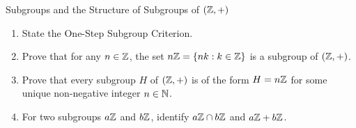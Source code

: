 \begin{exercise}{Subgroups and the Structure of Subgroups of $(\mathbb{Z}, +)$}
\begin{enumerate}[leftmargin=1.5em,itemsep=2pt]
  \item State the One-Step Subgroup Criterion.
  \item Prove that for any $n \in \mathbb{Z}$, the set $n\mathbb{Z} = \{nk : k \in \mathbb{Z}\}$ is a subgroup of $(\mathbb{Z}, +)$.
  \item Prove that every subgroup $H$ of $(\mathbb{Z}, +)$ is of the form $H = n\mathbb{Z}$ for some unique non-negative integer $n \in \mathbb{N}$.
  \item For two subgroups $a\mathbb{Z}$ and $b\mathbb{Z}$, identify $a\mathbb{Z} \cap b\mathbb{Z}$ and $a\mathbb{Z} + b\mathbb{Z}$.
\end{enumerate}
\end{exercise}

\begin{tabletworkspace}[5.5cm]
\end{tabletworkspace}

